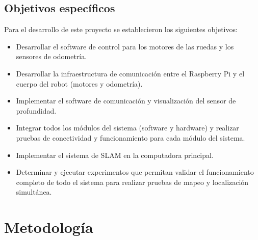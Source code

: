 \subsection{Objetivos específicos}
Para el desarrollo de este proyecto se establecieron los siguientes objetivos:

\begin{itemize} %
    \item Desarrollar el software de control para los motores de las ruedas y los sensores de odometría.
    \item Desarrollar la infraestructura de comunicación entre el Raspberry Pi y el cuerpo del robot (motores y odometría). \item Implementar el software de comunicación y visualización del sensor de profundidad.
    \item Integrar todos los módulos del sistema (software y hardware) y realizar pruebas de conectividad y funcionamiento para cada módulo del sistema.
    \item Implementar el sistema de SLAM en la computadora principal.
    \item Determinar y ejecutar experimentos que permitan validar el funcionamiento completo de todo el sistema para realizar pruebas de mapeo y localización simultánea.
\end{itemize}

\section{Metodología}

